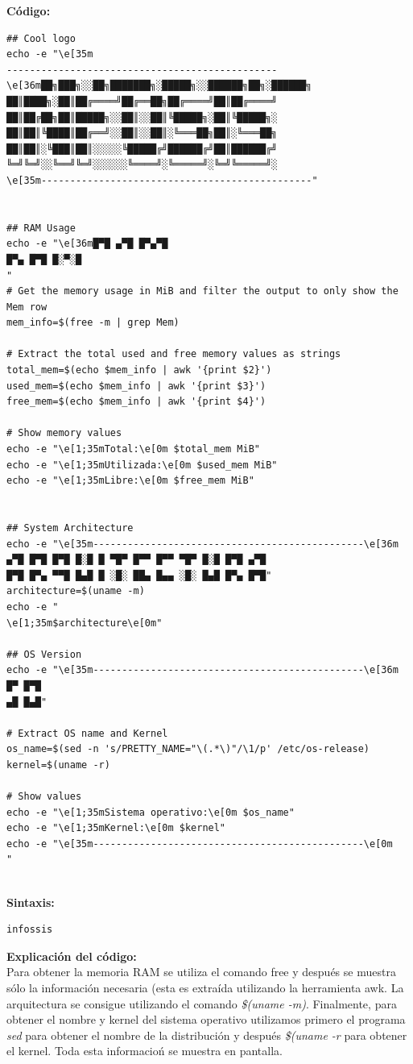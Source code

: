 \documentclass[12pt,a4paper]{article}
\begin{document}
    \textbf{Código:}
    \\
    \begin{lstlisting}[style=BashInputStyle]
## Cool logo
echo -e "\e[35m
-----------------------------------------------
\e[36m██╗███╗░░██╗███████╗░█████╗░░██████╗██╗░██████╗
██║████╗░██║██╔════╝██╔══██╗██╔════╝██║██╔════╝
██║██╔██╗██║█████╗░░██║░░██║╚█████╗░██║╚█████╗░
██║██║╚████║██╔══╝░░██║░░██║░╚═══██╗██║░╚═══██╗
██║██║░╚███║██║░░░░░╚█████╔╝██████╔╝██║██████╔╝
╚═╝╚═╝░░╚══╝╚═╝░░░░░░╚════╝░╚═════╝░╚═╝╚═════╝░
\e[35m-----------------------------------------------"


## RAM Usage
echo -e "\e[36m█▀█ ▄▀█ █▀▄▀█
█▀▄ █▀█ █░▀░█
"
# Get the memory usage in MiB and filter the output to only show the Mem row
mem_info=$(free -m | grep Mem)

# Extract the total used and free memory values as strings
total_mem=$(echo $mem_info | awk '{print $2}')
used_mem=$(echo $mem_info | awk '{print $3}')
free_mem=$(echo $mem_info | awk '{print $4}')

# Show memory values
echo -e "\e[1;35mTotal:\e[0m $total_mem MiB"
echo -e "\e[1;35mUtilizada:\e[0m $used_mem MiB"
echo -e "\e[1;35mLibre:\e[0m $free_mem MiB"


## System Architecture
echo -e "\e[35m-----------------------------------------------\e[36m
▄▀█ █▀█ █▀█ █░█ █ ▀█▀ █▀▀ █▀▀ ▀█▀ █░█ █▀█ ▄▀█
█▀█ █▀▄ ▀▀█ █▄█ █ ░█░ ██▄ █▄▄ ░█░ █▄█ █▀▄ █▀█"
architecture=$(uname -m)
echo -e "
\e[1;35m$architecture\e[0m"

## OS Version
echo -e "\e[35m-----------------------------------------------\e[36m
█▀ █▀█
▄█ █▄█"

# Extract OS name and Kernel
os_name=$(sed -n 's/PRETTY_NAME="\(.*\)"/\1/p' /etc/os-release)
kernel=$(uname -r)

# Show values
echo -e "\e[1;35mSistema operativo:\e[0m $os_name"
echo -e "\e[1;35mKernel:\e[0m $kernel"
echo -e "\e[35m-----------------------------------------------\e[0m
"
    \end{lstlisting}
    
    \\
    \noindent
    \textbf{Sintaxis:} \\
    \begin{lstlisting}[style=BashInputStyle]
infossis
    \end{lstlisting}
    \noindent
    \textbf{Explicación del código:} \\
    \noindent
    Para obtener la memoria RAM se utiliza el comando free y después se muestra sólo la información necesaria (esta es extraída utilizando la herramienta awk. La arquitectura se consigue utilizando el comando \textit{\$(uname -m)}. Finalmente, para obtener el nombre y kernel del sistema operativo utilizamos primero el programa \textit{sed} para obtener el nombre de la distribución y después \textit{\$(uname -r} para obtener el kernel. Toda esta informacioń se muestra en pantalla.
    
\end{document}
